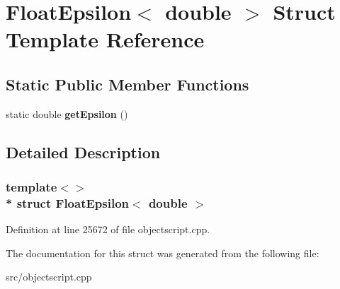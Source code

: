 \hypertarget{struct_float_epsilon_3_01double_01_4}{}\section{Float\+Epsilon$<$ double $>$ Struct Template Reference}
\label{struct_float_epsilon_3_01double_01_4}
\subsection*{Static Public Member Functions}
\begin{DoxyCompactItemize}
\item 
static double {\bfseries get\+Epsilon} ()\hypertarget{struct_float_epsilon_3_01double_01_4_ad8d7cc6187bac166e7439ee828eaa7d4}{}\label{struct_float_epsilon_3_01double_01_4_ad8d7cc6187bac166e7439ee828eaa7d4}

\end{DoxyCompactItemize}


\subsection{Detailed Description}
\subsubsection*{template$<$$>$\\*
struct Float\+Epsilon$<$ double $>$}



Definition at line 25672 of file objectscript.\+cpp.



The documentation for this struct was generated from the following file\+:\begin{DoxyCompactItemize}
\item 
src/objectscript.\+cpp\end{DoxyCompactItemize}

